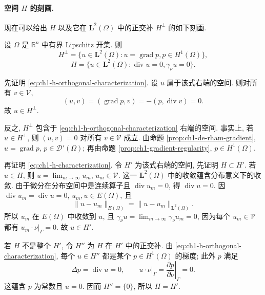 \paragraph{空间 $H$ 的刻画.}
现在可以给出 $H$ 以及它在 $\mathbf L^2(\Omega)$ 中的正交补 $H^\perp$ 的如下刻画.

\begin{Theorem}
\label{thm:ch1-characterization-h}
设 $\Omega$ 是 $\mathbb R^n$ 中有界 Lipschitz 开集. 则
\begin{equation}
H^\perp=\{u\in\mathbf L^2(\Omega):u=\operatorname{grad}p, p\in H^1(\Omega)\},
\label{eq:ch1-h-orthogonal-characterization}
\end{equation}
\begin{equation}
H=\{u\in\mathbf L^2(\Omega):\operatorname{div}u=0, \gamma_\nu u=0\}.
\label{eq:ch1-h-characterization}
\end{equation}
\end{Theorem}

\begin{Proof}
先证明 \eqref{eq:ch1-h-orthogonal-characterization}. 设 $u$ 属于该式右端的空间. 则对所有 $v\in\mathcal V$,
\begin{equation}
(u,v)=(\operatorname{grad}p,v)=-(p,\operatorname{div}v)=0.
\label{eq:ch1-gradient-orthogonal-v}
\end{equation}
故 $u\in H^\perp$.

反之, $H^\perp$ 包含于 \eqref{eq:ch1-h-orthogonal-characterization} 右端的空间. 事实上, 若 $u\in H^\perp$, 则 $(u,v)=0$ 对所有 $v\in\mathcal V$ 成立. 由命题 \ref{prop:ch1-de-rham-gradient}, $u=\operatorname{grad}p$, $p\in\mathcal D'(\Omega)$; 再由命题 \ref{prop:ch1-gradient-regularity}, $p\in H^1(\Omega)$.

再证明 \eqref{eq:ch1-h-characterization}. 令 $H'$ 为该式右端的空间, 先证明 $H\subset H'$. 若 $u\in H$, 则 $u=\lim_{m\to\infty}u_m$, $u_m\in\mathcal V$. 这一 $\mathbf L^2(\Omega)$ 中的收敛蕴含分布意义下的收敛. 由于微分在分布空间中是连续算子且 $\operatorname{div}u_m=0$, 得 $\operatorname{div}u=0$. 因 $\operatorname{div}u_m=\operatorname{div}u=0$, $u_m,u\in E(\Omega)$, 且
\begin{equation}
\lVert u-u_m\rVert_{E(\Omega)}=\lVert u-u_m\rVert_{\mathbf L^2(\Omega)}.
\label{eq:ch1-e-l2-norm-on-divfree}
\end{equation}
所以 $u_m$ 在 $E(\Omega)$ 中收敛到 $u$, 且 $\gamma_\nu u=\lim_{m\to\infty}\gamma_\nu u_m=0$, 因为每个 $u_m\in\mathcal V$ 都有 $u_m\cdot\nu|_\Gamma=0$. 故 $u\in H'$.

若 $H$ 不是整个 $H'$, 令 $H''$ 为 $H$ 在 $H'$ 中的正交补. 由 \eqref{eq:ch1-h-orthogonal-characterization}, 每个 $u\in H''$ 都是某个 $p\in H^1(\Omega)$ 的梯度; 此外 $p$ 满足
\begin{equation}
\Delta p=\operatorname{div}u=0,
\qquad u\cdot\nu|_\Gamma=\left.\frac{\partial p}{\partial\nu}\right|_\Gamma=0.
\label{eq:ch1-harmonic-neumann-zero}
\end{equation}
这蕴含 $p$ 为常数且 $u=0$. 因而 $H''=\{0\}$, 所以 $H=H'$.
\end{Proof}


